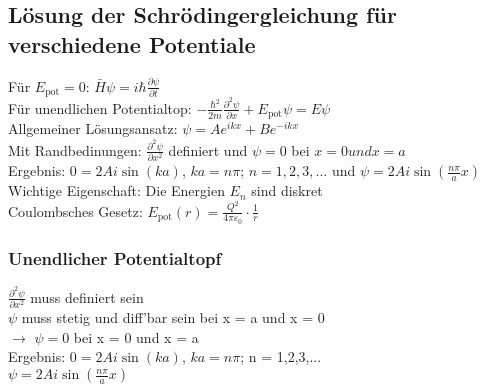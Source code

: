 \documentclass[fs, footer]{latex4ei}
\begin{document}
\begin{multicols*}{4}
\subsection{Lösung der Schrödingergleichung für verschiedene Potentiale}
Für $E_{\text{pot}} = 0$: $\bar H \psi = i\hbar \frac{\partial \psi}{\partial t}$\\
Für unendlichen Potentialtop: $ - \frac{\hbar^2}{2m}\frac{\partial^2 \psi}{\partial x} + E_{\text{pot}}\psi = E\psi$\\
Allgemeiner Lösungsansatz: $\psi = Ae^{ikx} + Be^{-ikx}$\\
Mit Randbedinungen: $\frac{\partial ^2 \psi}{\partial x^2}$ definiert und $\psi = 0$ bei $x=0 und x=a$\\

Ergebnis: $0 = 2Ai\sin(ka)$, $ka = n\pi$; $n = 1,2,3,...$ und $\psi = 2Ai\sin(\frac{n\pi}{a}x)$\\

Wichtige Eigenschaft: Die Energien $E_n$ sind diskret\\

Coulombsches Gesetz: $E_{\text{pot}}(r) = \frac{Q^2}{4\pi\varepsilon_0}\cdot\frac{1}{r}$\\

\subsubsection{Unendlicher Potentialtopf}
$\frac{\partial^2 \psi}{\partial x^2}$ muss definiert sein\\
$\psi$ muss stetig und diff'bar sein bei x = a und x = 0\\
$\rightarrow$ $\psi = 0$ bei x = 0 und x = a\\

Ergebnis: $0 = 2Ai\sin(ka)$, $ka = n\pi$; n = 1,2,3,...\\
$\psi = 2Ai\sin(\frac{n\pi}{a}x)$

\end{multicols*}
\end{document}
